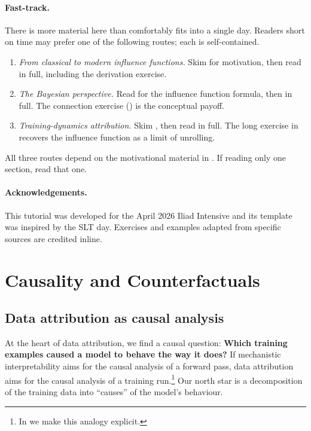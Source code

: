 \documentclass[11pt]{article}
\begin{document}
\paragraph{Fast-track.} There is more material here than comfortably fits into a single day. Readers short on time may prefer one of the following routes; each is self-contained.
\begin{enumerate}[label=\textbf{Route \arabic*.}, leftmargin=*]
  \item \emph{From classical to modern influence functions.} Skim  for motivation, then read  in full, including the derivation exercise.
  \item \emph{The Bayesian perspective.} Read  for the influence function formula, then  in full. The connection exercise () is the conceptual payoff.
  \item \emph{Training-dynamics attribution.} Skim , then read  in full. The long exercise in  recovers the influence function as a limit of unrolling.
\end{enumerate}
All three routes depend on the motivational material in . If reading only one section, read that one.

\paragraph{Acknowledgements.} This tutorial was developed for the April 2026 Iliad Intensive and its template was inspired by the SLT day. 
Exercises and examples adapted from specific sources are credited inline.

\section{Causality and Counterfactuals}\label{sec:causality}

\subsection{Data attribution as causal analysis}\label{subsec:da-causal}

At the heart of data attribution, we find a causal question: \textbf{Which training examples caused a model to behave the way it does?}
If mechanistic interpretability aims for the causal analysis of a forward pass, data attribution aims for the causal analysis of a training run.\footnote{In  we make this analogy explicit.} Our north star is a decomposition of the training data into ``causes'' of the model's behaviour.
\end{document}
